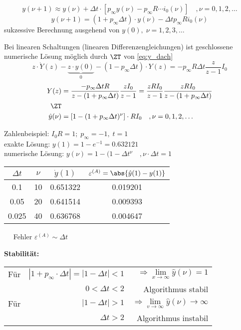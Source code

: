 \begin{equation}
y(\nu+1)\approx y(\nu) + \Delta t\cdot\left[p_\infty y(\nu) - p_\infty R\cdots i_0(\nu)\right]\quad ,\nu = 0,1,2,\ldots
\end{equation}
\begin{equation}
\hat{y}(\nu+1) = (1+p_\infty\Delta t)\cdot y(\nu) - \Delta t p_\infty R i_0(\nu)
\label{eq:y_dach}
\end{equation}
sukzessive Berechnung ausgehend von $y(0),\;\nu = 1,2,3,\ldots$

Bei linearen Schaltungen (linearen Differenzengleichungen) ist geschlossene numerische Lösung möglich durch $\ZT$ von \autoref{eq:y_dach}
\begin{equation}
z\cdot\dot{Y}(z)-\underbrace{z\cdot y(0)}_{0} - (1-p_\infty\Delta t)\cdot Y(z) = -p_\infty R\Delta t \frac{z}{z-1}I_0
\end{equation}
\begin{equation}
\begin{split}
Y(z) &= \frac{-p_\infty\Delta t R}{z-(1+p_\infty\Delta t)}\frac{zI_0}{z-1} = \frac{zRI_0}{z-1}\frac{zRI_0}{z-(1+p_\infty\Delta t)}\\
\ZT\\
\hat{y}(\nu) &= \left[1-(1+p_\infty\Delta t)^\nu\right]\cdot RI_0\quad ,\nu = 0,1,2,\ldots
\end{split}
\end{equation}

Zahlenbeispiel: $I_0R = 1;\;p_\infty = -1,\; t=1$\\
exakte Lösung: $y(1) = 1-e^{-1} = \num{0.632121}$\\
numerische Lösung: $y(\nu) = 1-(1-\Delta t^\nu\quad ,\nu\cdot\Delta t = 1$

\begin{tabular}{c|c|c|c}
$\Delta t$ & $\nu$ & $\dot{y}(1)$ & $\varepsilon^{(A)} = \abs{\hat{y}(1)-y(1)}$\\
\hline
\num{0.1} & \num{10} & \num{0.651322} & \num{0.019201}\\
\num{0.05} & \num{20} & \num{0.641514} & \num{0.009393}\\
\num{0.025} & \num{40} & \num{0.636768} & \num{0.004647}\\
\end{tabular}
$\quad$ Fehler $\varepsilon^{(A)}\sim \Delta t$

\textbf{Stabilität: }\\
\begin{tabular}{rrr}
Für & $|1+p_\infty \cdot \Delta t| = |1-\Delta t| < 1$ & $\Rightarrow \lim\limits_{x\rightarrow \infty} \hat{y}(\nu) = 1$\\
& $0 < \Delta t < 2$ & Algorithmus stabil\\
Für & $|1-\Delta t| > 1$ & $\Rightarrow \lim\limits_{v \rightarrow \infty} \hat{y}(\nu) \rightarrow \infty$ \\
& $\Delta t > 2$ & Algorithmus instabil
\end{tabular}

